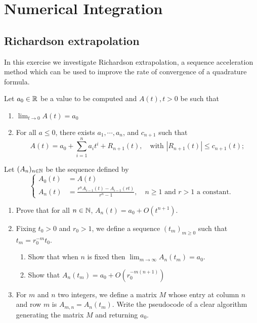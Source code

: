 \chapter{Numerical Integration}

\section{Richardson extrapolation}
In this exercise we investigate Richardson extrapolation, a sequence acceleration method which can be used to improve the rate of convergence of a quadrature formula.

Let \(a_0\in\mathbb{R}\) be a value to be computed and \(A(t), t > 0\) be such that
\begin{enumerate}
	\item \(\lim_{t\to0}A(t)=a_0\)
	\item For all \(a\leq0\), there exists \(a_1,\cdots,a_n\), and \(c_{n+1}\) such that
	\[ A(t)=a_0+\sum_{i=1}^{n}a_i t^i+R_{n+1}(t),\quad\text{with } |R_{n+1}(t)|\leq c_{n+1}(t);  \]
\end{enumerate}
Let \((A_n)_{n\in\mathbb{N}}\) be the sequence defined by
\[ \begin{cases} A_0(t)&= A(t) \\ A_n(t)&=\frac{r^nA_{i-1}(t)-A_{i-1}(rt)}{r^n-1},\quad n\geq1 \text{ and } r>1 \text{ a constant.} \end{cases} \]
\begin{enumerate}
	\item Prove that for all \(n\in\mathbb{N}\), \(A_n(t)= a_0 + O(t^{n+1})\).
	\item Fixing \(t_0 > 0\) and \(r_0 > 1\), we define a sequence \((t_m)_{m\geq0}\) such that \(t_m = r_0^{-m} t_0\).
	\begin{enumerate}
		\item Show that when $n$ is fixed then \(\lim_{m\to\infty}A_n(t_m)=a_0\).
		\item Show that \(A_n(t_m)=a_0+O(r_0^{-m(n+1)}) \)
	\end{enumerate}
	\item For $m$ and $n$ two integers, we define a matrix $M$ whose entry at column $n$ and row $m$ is \(A_{m,n}=A_n(t_m)\).
	Write the pseudocode of a clear algorithm generating the matrix $M$ and returning $a_0$.
\end{enumerate}

